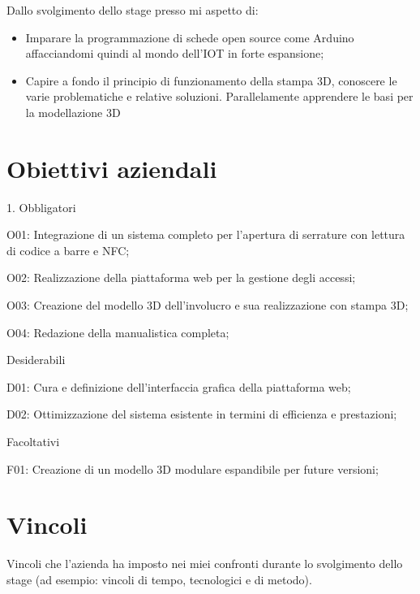 Dallo svolgimento dello stage presso \lab{} mi aspetto di:
\begin{itemize}
\item Imparare la programmazione di schede open source come Arduino affacciandomi quindi al mondo dell'IOT in forte espansione;
\item Capire a fondo il principio di funzionamento della stampa 3D, conoscere le varie problematiche e relative soluzioni. Parallelamente apprendere le basi per la modellazione 3D
\end{itemize}

\section{Obiettivi aziendali}
1.	Obbligatori

O01: Integrazione di un sistema completo per l'apertura di serrature con lettura di codice a barre e NFC; 

O02: Realizzazione della piattaforma web per la gestione degli accessi; 

O03: Creazione del modello 3D dell'involucro e sua realizzazione con stampa 3D; 

O04: Redazione della manualistica completa; 

Desiderabili

D01: Cura e definizione dell'interfaccia grafica della piattaforma web;

D02: Ottimizzazione del sistema esistente in termini di efficienza e prestazioni; 


Facoltativi 

F01: Creazione di un modello 3D modulare espandibile per future versioni; 


\section{Vincoli}
Vincoli che l'azienda ha imposto nei miei confronti durante lo svolgimento dello stage (ad esempio: vincoli di tempo, tecnologici e di metodo).
